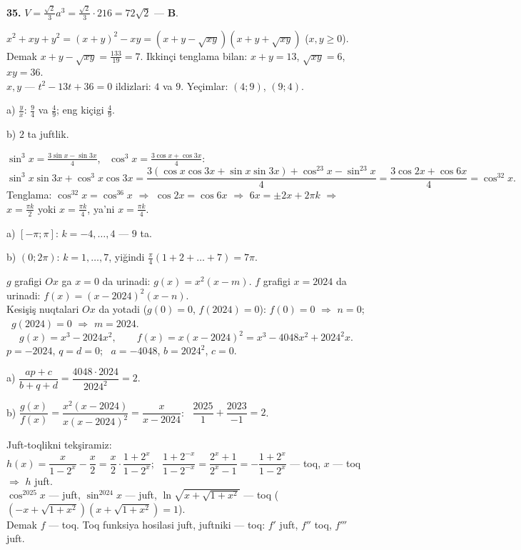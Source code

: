 \textbf{35.} $V=\frac{\sqrt2}3a^3=\frac{\sqrt2}3\cdot216=72\sqrt2$ — \textbf{B}.

\newpage
{}
$x^2+xy+y^2=(x+y)^2-xy=\left(x+y-\sqrt{xy}\right)\left(x+y+\sqrt{xy}\right)$ ($x,y\ge0$).\\
Demak $x+y-\sqrt{xy}=\frac{133}{19}=7$. Ikkinçi tenglama bilan: $x+y=13$, $\sqrt{xy}=6$, $xy=36$.\\
$x,y$ — $t^2-13t+36=0$ ildizlari: $4$ va $9$. Yeçimlar: $(4;9)$, $(9;4)$.

a) $\frac{y}{x}$: $\frac94$ va $\frac49$; eng kiçigi $\frac49$.

b) $2$ ta juftlik.

\newpage
{}
$\sin^3x=\frac{3\sin x-\sin3x}4$, \ $\cos^3x=\frac{3\cos x+\cos3x}4$:
\[\sin^3x\sin3x+\cos^3x\cos3x=\frac{3(\cos x\cos3x+\sin x\sin3x)+\cos^23x-\sin^23x}4=\frac{3\cos2x+\cos6x}4=\cos^32x.\]
Tenglama: $\cos^32x=\cos^36x$ $\Rightarrow$ $\cos2x=\cos6x$ $\Rightarrow$ $6x=\pm2x+2\pi k$ $\Rightarrow$ $x=\frac{\pi k}2$ yoki $x=\frac{\pi k}4$, ya'ni $x=\frac{\pi k}4$.

a) $[-\pi;\pi]$: $k=-4,\dots,4$ — $9$ ta.

b) $(0;2\pi)$: $k=1,\dots,7$, yiğindi $\frac\pi4(1+2+\dots+7)=7\pi$.

\newpage
{}
$g$ grafigi $Ox$ ga $x=0$ da urinadi: $g(x)=x^2(x-m)$. $f$ grafigi $x=2024$ da urinadi: $f(x)=(x-2024)^2(x-n)$.\\
Kesişiş nuqtalari $Ox$ da yotadi ($g(0)=0$, $f(2024)=0$): $f(0)=0$ $\Rightarrow$ $n=0$; \ $g(2024)=0$ $\Rightarrow$ $m=2024$.
\[g(x)=x^3-2024x^2,\qquad f(x)=x(x-2024)^2=x^3-4048x^2+2024^2x.\]
$p=-2024$, $q=d=0$; \ $a=-4048$, $b=2024^2$, $c=0$.

a) $\dfrac{ap+c}{b+q+d}=\dfrac{4048\cdot2024}{2024^2}=2$.

b) $\dfrac{g(x)}{f(x)}=\dfrac{x^2(x-2024)}{x(x-2024)^2}=\dfrac x{x-2024}$: \ $\dfrac{2025}1+\dfrac{2023}{-1}=2$.

\newpage
{}
Juft-toqlikni tekşiramiz:\\
$h(x)=\dfrac x{1-2^x}-\dfrac x2=\dfrac x2\cdot\dfrac{1+2^x}{1-2^x}$; \ $\dfrac{1+2^{-x}}{1-2^{-x}}=\dfrac{2^x+1}{2^x-1}=-\dfrac{1+2^x}{1-2^x}$ — toq, $x$ — toq $\Rightarrow$ $h$ juft.\\
$\cos^{2025}x$ — juft, $\sin^{2024}x$ — juft, $\ln\sqrt{x+\sqrt{1+x^2}}$ — toq ($(-x+\sqrt{1+x^2})(x+\sqrt{1+x^2})=1$).\\
Demak $f$ — toq. Toq funksiya hosilasi juft, juftniki — toq: $f'$ juft, $f''$ toq, $f'''$ juft.

